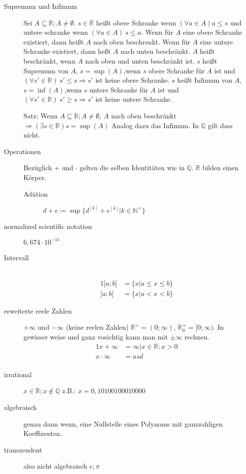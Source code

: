 \documentclass[12pt,a4paper]{article}
\DeclareMathOperator\supri{sup}
\DeclareMathOperator\infim{inf}
\begin{document}
\begin{description}
	\item[Supremum und Infimum] Sei $A \subseteq \mathbb{R}; A \not = \emptyset$. $s \in \mathbb{R}$ heißt obere Schranke wenn $(\forall a \in A) a \leq s$ und untere schranke wenn $(\forall a \in A)\ s \leq a$. Wenn für $A$ eine obere Schranke existiert, dann heißt $A$ nach oben beschrenkt. Wenn für $A$ eine untere Schranke existiert, dann heßt $A$ nach unten beschränkt. $A$ heißt beschränkt, wenn $A$ nach oben und unten beschränkt ist. $s$ heißt Supremum von $A$, $s = \sup(A)$,wenn $s$ obere Schranke für $A$ ist und $(\forall s' \in \mathbb{R})\ s' \leq s \Rightarrow s'$ ist keine obere Schranke. $s$ heißt Infimum von $A$, $s = \infim(A)$,wenn $s$ untere Schranke für $A$ ist und $(\forall s' \in \mathbb{R})\ s' \geq s \Rightarrow s'$ ist keine untere Schranke.

		Satz: Wenn $A \subseteq \mathbb{R}; A \not = \emptyset,\ A$ nach oben beschränkt $\Rightarrow (\exists s \in \mathbb{R}) s = \supri(A)$ Analog dazu das Infimum. In $\mathbb{Q}$ gilt dass nicht.

	\item[Operationen] Bezüglich + und $\cdot$ gelten die selben Identitäten wie in $\mathbb{Q}$. $\mathbb{R}$ bilden einen Körper.
		\begin{description}
			\item[Adiition] $d + e \coloneqq \supri \lbrace d^{[k]} + e^[k] | k \in \mathbb{N}^+ \rbrace$
			\item[]
		\end{description}
	\item[normalized scientific notation] $6,674 \cdot 10^{-11}$
	\item[Intervall] \
		\begin{alignat*}{1}
			\lbrack a; b \rbrack & = \lbrace x | a \leq x\leq b \rbrace \\
			\rbrack a; b \lbrack & = \lbrace x | a < x < b \rbrace
		\end{alignat*}
	\item[erweiterte reele Zahlen] $+\infty$ und $-\infty$ (keine reelen Zahlen) $\mathbb{R}^+ = (0; \infty)$, $\mathbb{R}_0^+=\lbrack 0 ; \infty)$. In gewisser weise und ganz vosichtig kann man mit $\pm \infty$ rechnen.
		\begin{alignat*}{1}
			x + \infty     & = \infty | x \in \mathbb{R}; x > 0 \\
			x \cdot \infty & = asd                              \\
		\end{alignat*}
	\item[irrational] $x \in \mathbb{R}; x \not \in \mathbb{Q}$ z.B.: $x = 0,10100100010000$
	\item[algebraisch] genau dann wenn, eine Nullstelle eines Polynoms mit ganzzahligen Koeffizenten.
	\item[transzendent] also nicht algebraisch $e; \pi$
\end{description}
\end{document}
